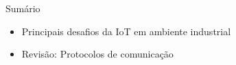 
\begin{frame}{Sumário}
    \begin{itemize}
        \item Principais desafios da IoT em ambiente industrial
        \item Revisão: Protocolos de comunicação
    \end{itemize}
\end{frame}